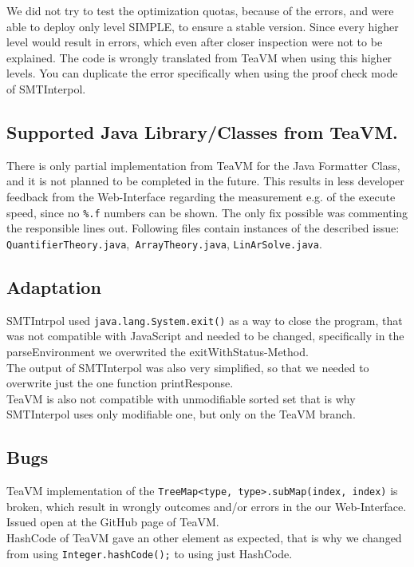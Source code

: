 \documentclass[12pt]{article}
\begin{document}
We did not try to test the optimization quotas, because of the errors, and were able to deploy only level SIMPLE, to ensure a stable version.
Since every higher level would result in  errors, which even after closer inspection were not to be explained. The code is wrongly translated from TeaVM when using this higher levels. You can duplicate the error specifically when using the proof check mode of SMTInterpol.

\subsection{Supported Java Library/Classes from TeaVM.}
There is only partial implementation from TeaVM for the Java Formatter Class, and it is not planned to be completed in the future\cite{4}. This results in less developer feedback from the Web-Interface regarding the measurement e.g. of the execute speed, since no \texttt{\%.f} numbers can be shown. The only fix possible was commenting the responsible lines out.
Following files contain instances of the described issue: \texttt{QuantifierTheory.java},\texttt{ ArrayTheory.java}, \texttt{LinArSolve.java}.

\subsection{Adaptation}
SMTIntrpol used \texttt{java.lang.System.exit()} as a way to close the program, that was not compatible with JavaScript and needed to be changed, specifically in the parseEnvironment we overwrited the exitWithStatus-Method. \\

The output of SMTInterpol was also very simplified, so that we needed to overwrite just the one function printResponse.\\

TeaVM is also not compatible with unmodifiable sorted set that is why SMTInterpol uses only modifiable one, but only on the TeaVM branch.

\subsection{Bugs}
TeaVM implementation of the \texttt{TreeMap<type, type>.subMap(index, index)} is broken, which result in wrongly outcomes and/or errors in the our Web-Interface. Issued open at the GitHub page\cite{5} of TeaVM.\\

HashCode of TeaVM gave an other element as expected, that is why we changed from using \texttt{Integer.hashCode();} to using just HashCode\cite{6}.
\end{document}
